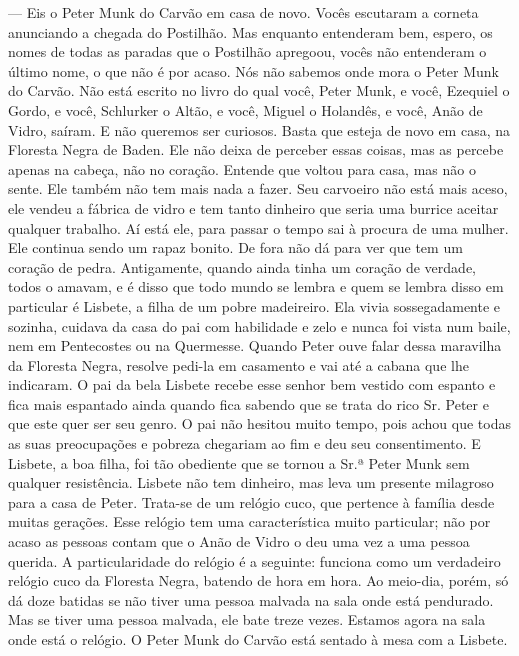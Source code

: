 \begin{myparindent}{0pt}
\begin{Parskip}
 --- Eis o Peter Munk do Carvão em casa de novo. Vocês escutaram a
corneta anunciando a chegada do Postilhão. Mas enquanto entenderam bem,
espero, os nomes de todas as paradas que o Postilhão apregoou, vocês não
entenderam o último nome, o que não é por acaso. Nós não sabemos onde
mora o Peter Munk do Carvão. Não está escrito no livro do qual você,
Peter Munk, e você, Ezequiel o Gordo, e você, Schlurker o Altão, e você,
Miguel o Holandês, e você, Anão de Vidro, saíram. E não queremos ser
curiosos. Basta que esteja de novo em casa, na Floresta Negra de Baden.
Ele não deixa de perceber essas coisas, mas as percebe apenas na cabeça,
não no coração. Entende que voltou para casa, mas não o sente. Ele
também não tem mais nada a fazer. Seu carvoeiro não está mais aceso, ele
vendeu a fábrica de vidro e tem tanto dinheiro que seria uma burrice
aceitar qualquer trabalho. Aí está ele, para passar o tempo sai à
procura de uma mulher. Ele continua sendo um rapaz bonito. De fora não
dá para ver que tem um coração de pedra. Antigamente, quando ainda tinha
um coração de verdade, todos o amavam, e é disso que todo mundo se
lembra e quem se lembra disso em particular é Lisbete, a filha de um
pobre madeireiro. Ela vivia sossegadamente e sozinha, cuidava da casa do
pai com habilidade e zelo e nunca foi vista num baile, nem em
Pentecostes ou na Quermesse. Quando Peter ouve falar dessa maravilha da
Floresta Negra, resolve pedi-la em casamento e vai até a cabana que lhe
indicaram. O pai da bela Lisbete recebe esse senhor bem vestido com
espanto e fica mais espantado ainda quando fica sabendo que se trata do
rico Sr. Peter e que este quer ser seu genro. O pai não hesitou muito
tempo, pois achou que todas as suas preocupações e pobreza chegariam ao
fim e deu seu consentimento. E Lisbete, a boa filha, foi tão obediente
que se tornou a Sr.ª Peter Munk sem qualquer resistência. Lisbete não
tem dinheiro, mas leva um presente milagroso para a casa de Peter.
Trata-se de um relógio cuco, que pertence à família desde muitas
gerações. Esse relógio tem uma característica muito particular; não por
acaso as pessoas contam que o Anão de Vidro o deu uma vez a uma pessoa
querida. A particularidade do relógio é a seguinte: funciona como um
verdadeiro relógio cuco da Floresta Negra, batendo de hora em hora. Ao
meio-dia, porém, só dá doze batidas se não tiver uma pessoa malvada na
sala onde está pendurado. Mas se tiver uma pessoa malvada, ele bate
treze vezes. Estamos agora na sala onde está o relógio. O Peter Munk do
Carvão está sentado à mesa com a Lisbete.


\end{Parskip}
\end{myparindent}
